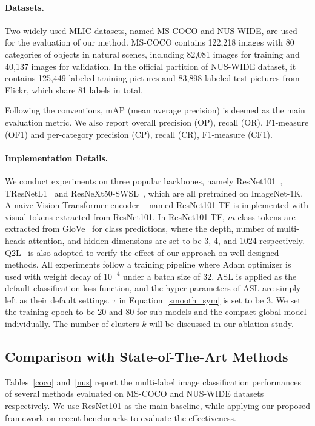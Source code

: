 \documentclass{article}
\begin{document}
\paragraph{Datasets.}
Two widely used MLIC datasets, named MS-COCO and NUS-WIDE, are used for the evaluation of our method.
MS-COCO contains 122,218 images with 80 categories of objects in natural scenes, including 82,081 images for training and 40,137 images for validation.
In the official partition of NUS-WIDE dataset, it contains 125,449 labeled training pictures and 83,898 labeled test pictures from Flickr, which share 81 labels in total.

Following the conventions, mAP (mean average precision) is deemed as the main evaluation metric. We also report overall precision (OP), recall (OR), F1-measure (OF1) and per-category precision (CP), recall (CR), F1-measure (CF1).

\paragraph{Implementation Details.}
We conduct experiments on three popular backbones, namely ResNet101~\cite{he2016deep}, TResNetL1~\cite{ridnik2021asymmetric} and ResNeXt50-SWSL~\cite{yalniz2019billion}, which are all pretrained on ImageNet-1K.
A naive Vision Transformer encoder ~\cite{dosovitskiy2020image} named ResNet101-TF is implemented with visual tokens extracted from ResNet101. In ResNet101-TF, $m$ class tokens are extracted from GloVe~\cite{pennington2014glove} for class predictions, where the depth, number of multi-heads attention, and hidden dimensions are set to be 3, 4, and 1024 respectively.
Q2L~\cite{liu2021query2label} is also adopted to verify the effect of our approach on well-designed methods.
All experiments follow a training pipeline where Adam optimizer is used with weight decay of $10^{-4}$ under a batch size of 32. ASL is applied as the default classification loss function, and the hyper-parameters of ASL are simply left as their default settings. $\tau$ in Equation~\ref{smooth_sym} is set to be 3.
We set the training epoch to be 20 and 80 for sub-models and the compact global model individually.
The number of clusters $k$ will be discussed in our ablation study.

\vspace{-0.1cm}
\subsection{Comparison with State-of-The-Art Methods}
Tables~\ref{coco} and~\ref{nus} report the multi-label image classification performances of several methods evaluated on MS-COCO and NUS-WIDE datasets respectively.
We use ResNet101 as the main baseline, while applying our proposed framework on recent benchmarks to evaluate the effectiveness.
\end{document}
